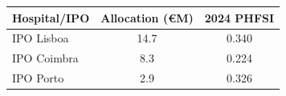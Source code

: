 \begin{tabular}{lcc}
\toprule
Hospital/IPO & Allocation (€M) & 2024 PHFSI \\
\midrule
IPO Lisboa & 14.7 & 0.340 \\
IPO Coimbra & 8.3 & 0.224 \\
IPO Porto & 2.9 & 0.326 \\
\bottomrule
\end{tabular}